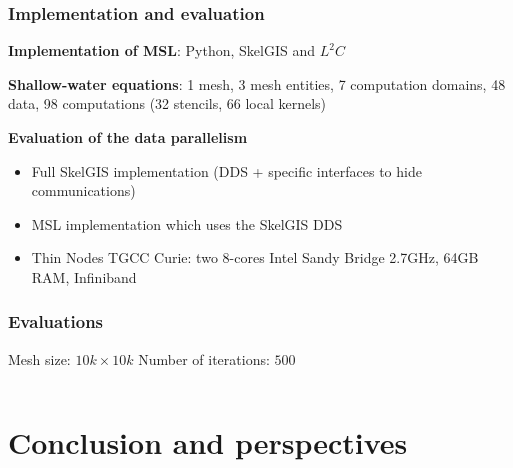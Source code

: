 \documentclass{beamer}
\begin{document}
\begin{frame}
\frametitle{Implementation and evaluation}
\textbf{Implementation of MSL}: Python, SkelGIS and $L^2C$

\medskip
\textbf{Shallow-water equations}: 1 mesh, 3 mesh entities, 7 computation domains, 48 data, 98 computations (32 stencils, 66 local kernels)

\medskip
\textbf{Evaluation of the data parallelism}
\begin{itemize}
\item Full SkelGIS implementation (DDS + specific interfaces to hide communications)
\item MSL implementation which uses the SkelGIS DDS
\item Thin Nodes TGCC Curie: two 8-cores Intel Sandy Bridge 2.7GHz, 64GB RAM, Infiniband
\end{itemize}
\end{frame}

\begin{frame}
\frametitle{Evaluations}
Mesh size: $10k \times 10k$
Number of iterations: $500$
\begin{columns}
\begin{column}{.5\textwidth}
\begin{center}
\end{center}
\end{column}
\begin{column}{.5\textwidth}
\begin{center}
\end{center}
\end{column}
\end{columns}
\end{frame}

\section{Conclusion and perspectives}
\end{document}
